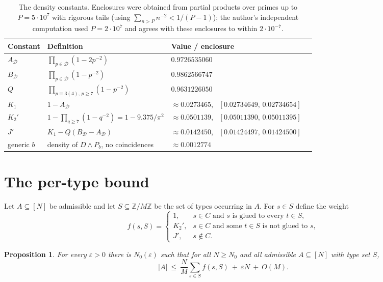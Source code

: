 \documentclass[11pt,a4paper]{article}
\theoremstyle{plain}
\newtheorem{proposition}[theorem]{Proposition}
\theoremstyle{definition}
\theoremstyle{remark}
\newcommand{\Dset}{\mathcal{D}}
\newcommand{\Z}{\mathbb{Z}}
\begin{document}
\begin{table}[ht]
\centering
\begin{tabular}{llll}
\toprule
Constant & Definition & Value / enclosure \\
\midrule
$A_{\Dset}$ & $\prod_{p\in\Dset}(1-2p^{-2})$ & $0.9726535060$\\
$B_{\Dset}$ & $\prod_{p\in\Dset}(1-p^{-2})$ & $0.9862566747$\\
$Q$ & $\prod_{p\equiv 3(4),\,p\ge 7}(1-p^{-2})$ & $0.9631226050$\\
$K_1$ & $1-A_{\Dset}$ & $\approx 0.0273465$, \ $[0.02734649,\,0.02734654]$\\
$K_2'$ & $1-\prod_{q\ge 7}(1-q^{-2})=1-9.375/\pi^2$ & $\approx 0.0501139$, \ $[0.05011390,\,0.05011395]$\\
$J'$ & $K_1-Q(B_{\Dset}-A_{\Dset})$ & $\approx 0.0142450$, \ $[0.01424497,\,0.01424500]$\\
generic $b$ & density of $D\wedge P_b$, no coincidences & $\approx 0.0012774$\\
\bottomrule
\end{tabular}
\caption{The density constants. Enclosures were obtained from partial products over primes up to
$P=5\cdot 10^{7}$ with rigorous tails (using $\sum_{n>P}n^{-2}<1/(P-1)$); the author's independent
computation used $P=2\cdot 10^{7}$ and agrees with these enclosures to within $2\cdot 10^{-7}$.}
\label{tab:consts}
\end{table}

\section{The per-type bound}\label{sec:pertype}

Let $A\subseteq[N]$ be admissible and let $S\subseteq\Z/M\Z$ be the set of types occurring in $A$. For
$s\in S$ define the weight
\[
 f(s,S)=
 \begin{cases}
 1, & s\in C \text{ and } s \text{ is glued to every } t\in S,\\[2pt]
 K_2', & s\in C \text{ and some } t\in S \text{ is not glued to } s,\\[2pt]
 J', & s\notin C .
 \end{cases}
\]

\begin{proposition}\label{prop:pertype}
For every $\varepsilon>0$ there is $N_0(\varepsilon)$ such that for all $N\ge N_0$ and all admissible
$A\subseteq[N]$ with type set $S$,
\[
 |A|\ \le\ \frac{N}{M}\sum_{s\in S}f(s,S)\ +\ \varepsilon N\ +\ O(M).
\]
\end{proposition}
\end{document}
